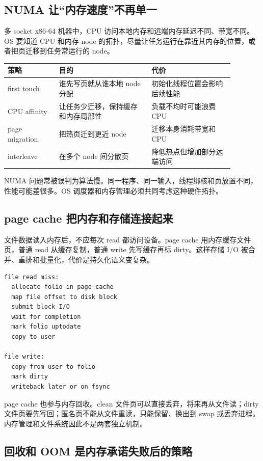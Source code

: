 \subsection{NUMA 让“内存速度”不再单一}

多 socket x86-64 机器中，CPU 访问本地内存和远端内存延迟不同、带宽不同。OS 要知道 CPU 和内存 node 的拓扑，尽量让任务运行在靠近其内存的位置，或者把页迁移到任务常运行的 node。

\begin{longtable}{p{0.2\linewidth}p{0.36\linewidth}p{0.32\linewidth}}
\toprule
策略 & 目的 & 代价 \\
\midrule
first touch & 谁先写页就从谁本地 node 分配 & 初始化线程位置会影响后续性能 \\
CPU affinity & 让任务少迁移，保持缓存和内存局部性 & 负载不均时可能浪费 CPU \\
page migration & 把热页迁到更近 node & 迁移本身消耗带宽和 CPU \\
interleave & 在多个 node 间分散页 & 降低热点但增加部分远端访问 \\
\bottomrule
\end{longtable}

NUMA 问题常被误判为算法慢。同一程序、同一输入，线程绑核和页放置不同，性能可能差很多。OS 调度器和内存管理必须共同考虑这种硬件拓扑。

\subsection{page cache 把内存和存储连接起来}

文件数据读入内存后，不应每次 read 都访问设备。page cache 用内存缓存文件页，普通 read 从缓存复制，普通 write 先写缓存再标 dirty。这样存储 I/O 被合并、重排和批量化，代价是持久化语义变复杂。

\begin{lstlisting}
file read miss:
  allocate folio in page cache
  map file offset to disk block
  submit block I/O
  wait for completion
  mark folio uptodate
  copy to user

file write:
  copy from user to folio
  mark dirty
  writeback later or on fsync
\end{lstlisting}

page cache 也参与内存回收。clean 文件页可以直接丢弃，将来再从文件读；dirty 文件页要先写回；匿名页不能从文件重读，只能保留、换出到 swap 或丢弃进程。内存管理和文件系统因此不是两套独立机制。

\subsection{回收和 OOM 是内存承诺失败后的策略}

